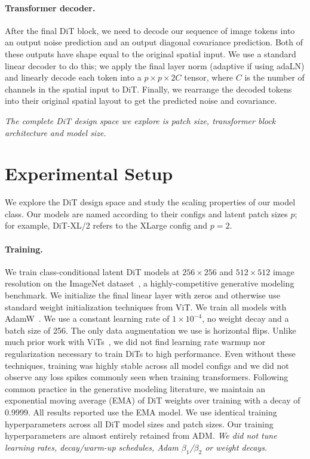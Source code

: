 \documentclass[10pt,twocolumn,letterpaper]{article}
\begin{document}
\vspace{-2mm}
\paragraph{Transformer decoder.}
After the final DiT block, we need to decode our sequence of image tokens into an output noise prediction and an output diagonal covariance prediction. Both of these outputs have shape equal to the original spatial input. We use a standard linear decoder to do this; we apply the final layer norm (adaptive if using adaLN) and linearly decode each token into a $p \times p \times 2C$ tensor, where $C$ is the number of channels in the spatial input to DiT. Finally, we rearrange the decoded tokens into their original spatial layout to get the predicted noise and covariance.

\textit{The complete DiT design space we explore is patch size, transformer block architecture and model size.}

\section{Experimental Setup}

We explore the DiT design space and study the scaling properties of our model class. Our models are named according to their configs and latent patch sizes $p$; for example, DiT-XL/2 refers to the XLarge config and $p=2$.
\paragraph{Training.} We train class-conditional latent DiT models at $256\times256$ and $512\times512$ image resolution on the ImageNet dataset~\cite{krizhevsky2012imagenet}, a highly-competitive generative modeling benchmark. We initialize the final linear layer with zeros and otherwise use standard weight initialization techniques from ViT. We train all models with AdamW~\cite{loshchilov2017decoupled,kingma2014adam}. We use a constant learning rate of $1 \times 10^{-4}$, no weight decay and a batch size of 256. The only data augmentation we use is horizontal flips. Unlike much prior work with ViTs~\cite{steiner2021train,Xiao2021}, we did not find learning rate warmup nor regularization necessary to train DiTs to high performance. Even without these techniques, training was highly stable across all model configs and we did not observe any loss spikes commonly seen when training transformers. Following common practice in the generative modeling literature, we maintain an exponential moving average (EMA) of DiT weights over training with a decay of 0.9999. All results reported use the EMA model. We use identical training hyperparameters across all DiT model sizes and patch sizes. Our training hyperparameters are almost entirely retained from ADM. \emph{We did \textit{not} tune learning rates, decay/warm-up schedules, Adam $\beta_1$/$\beta_2$ or weight decays.}
\vspace{-2mm}
\end{document}
